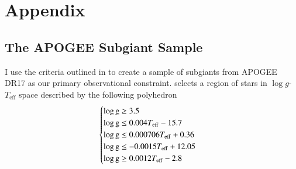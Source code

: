 \documentclass[12pt,oneside]{report}
\begin{document}


\newpage






\appendix
\chapter*{Appendix}
\renewcommand{\thesection}{A.\arabic{section}}
\renewcommand\thefigure{A\arabic{figure}}    
\renewcommand\theequation{A\arabic{equation}}    
\setcounter{figure}{0}
\setcounter{equation}{0}



\section{The APOGEE Subgiant Sample}\label{sec:jack}

I use the criteria outlined in \cite{jack_subgiant} to create a sample of subgiants from APOGEE DR17 \cite{apogee17} as our primary observational constraint. 
\cite{jack_subgiant} selects a region of stars in $\log g$-$T_\text{eff}$ space described by the following polyhedron
\begin{equation}
    \begin{cases} \label{eq:subgiant_selection}
        \log \text{g} \geq 3.5 \\
        \log \text{g} \leq 0.004T_{\rm eff} - 15.7 \\
        \log \text{g} \leq 0.000706T_{\rm eff} + 0.36 \\
        \log \text{g} \leq -0.0015T_{\rm eff} + 12.05 \\
        \log \text{g} \geq 0.0012T_{\rm eff} - 2.8 \\
    \end{cases}
\end{equation}
\end{document}
